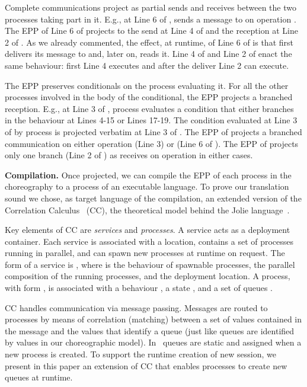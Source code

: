 Complete communications project as partial sends and receives
between the two processes taking part in it. E.g., at Line 6 of , 
sends a message to  on operation . The EPP of Line 6 of 
projects to the send at Line 4 of  and the reception at Line
2 of . As we already commented, the effect, at runtime, of
Line 6 of  is that first  delivers its message to  and,
later on,  reads it. Line 4 of  and Line 2 of
 enact the same behaviour: first Line 4 executes
 and after the deliver Line 2 can execute.

The EPP preserves conditionals on the process evaluating it. For all the
other processes involved in the body of the conditional, the EPP projects a
branched reception. E.g., at Line 3 of , process  evaluates a
condition that either branches in the behaviour at Lines 4-15 or Lines 17-19.
The condition evaluated at Line 3 of  by process  is projected
verbatim at Line 3 of . The EPP of  projects a
branched communication on either operation  (Line 3) or  (Line 6 of
). The EPP of  projects only one branch (Line 2
of ) as  receives on operation  in either cases.

\textbf{Compilation.}
Once projected, we can compile the EPP of each process in the choreography to
a process of an executable language. To prove our translation sound we chose,
as target language of the compilation, an extended version of the Correlation
Calculus~\cite{MC11} (CC), the theoretical model behind the Jolie
language~\cite{jolie:website}.

Key elements of CC are \emph{services} and \emph{processes}. A service acts
as a deployment container. Each service is associated with a location,
contains a set of processes running in parallel, and can spawn new processes
at runtime on request. The form of a service is , where
 is the behaviour of spawnable processes,  the parallel composition of
the running processes, and  the deployment location. A process, with form
, is associated with a behaviour , a state , and a set
of queues .

CC handles communication via message passing. Messages are routed to
processes by means of correlation (matching) between a set of values
contained in the message and the values that identify a queue (just like
queues are identified by values in our choreographic model). In~\cite{MC11}
queues are static and assigned when a new process is created. To support the
runtime creation of new session, we present in this paper an extension of CC
that enables processes to create new queues at runtime.

